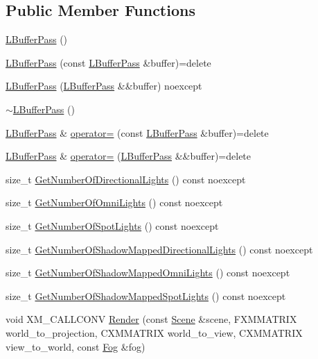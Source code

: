\subsection*{Public Member Functions}
\begin{DoxyCompactItemize}
\item 
\hyperlink{classmage_1_1_l_buffer_pass_acde2812780af700501ca945d62ed3dcc}{L\+Buffer\+Pass} ()
\item 
\hyperlink{classmage_1_1_l_buffer_pass_a0cd35fd1ded3c17d04c1689d1e30e476}{L\+Buffer\+Pass} (const \hyperlink{classmage_1_1_l_buffer_pass}{L\+Buffer\+Pass} \&buffer)=delete
\item 
\hyperlink{classmage_1_1_l_buffer_pass_ae68baaaa3fee2a76d64037f58d3e389b}{L\+Buffer\+Pass} (\hyperlink{classmage_1_1_l_buffer_pass}{L\+Buffer\+Pass} \&\&buffer) noexcept
\item 
\hyperlink{classmage_1_1_l_buffer_pass_ae9bad6fa2eb3827f9e28a3f21a974496}{$\sim$\+L\+Buffer\+Pass} ()
\item 
\hyperlink{classmage_1_1_l_buffer_pass}{L\+Buffer\+Pass} \& \hyperlink{classmage_1_1_l_buffer_pass_aec86026cd14a4b1609f709444bc453bd}{operator=} (const \hyperlink{classmage_1_1_l_buffer_pass}{L\+Buffer\+Pass} \&buffer)=delete
\item 
\hyperlink{classmage_1_1_l_buffer_pass}{L\+Buffer\+Pass} \& \hyperlink{classmage_1_1_l_buffer_pass_a3e4405a5af87c2c6f4839cb8502aa5de}{operator=} (\hyperlink{classmage_1_1_l_buffer_pass}{L\+Buffer\+Pass} \&\&buffer)=delete
\item 
size\+\_\+t \hyperlink{classmage_1_1_l_buffer_pass_a8a8c7af3c9c780f378411b928bb15a67}{Get\+Number\+Of\+Directional\+Lights} () const noexcept
\item 
size\+\_\+t \hyperlink{classmage_1_1_l_buffer_pass_a36adecea35365ec4ecc97698de68463c}{Get\+Number\+Of\+Omni\+Lights} () const noexcept
\item 
size\+\_\+t \hyperlink{classmage_1_1_l_buffer_pass_a52e32579e9843f3d6cf998cbf9a3f362}{Get\+Number\+Of\+Spot\+Lights} () const noexcept
\item 
size\+\_\+t \hyperlink{classmage_1_1_l_buffer_pass_a2e551261b4e661a0e6a773a0f3b66138}{Get\+Number\+Of\+Shadow\+Mapped\+Directional\+Lights} () const noexcept
\item 
size\+\_\+t \hyperlink{classmage_1_1_l_buffer_pass_ad78fcdd44e14f45837b864865b0dcf34}{Get\+Number\+Of\+Shadow\+Mapped\+Omni\+Lights} () const noexcept
\item 
size\+\_\+t \hyperlink{classmage_1_1_l_buffer_pass_a5b8f6954ae8d1005b2b1bdda1156f2aa}{Get\+Number\+Of\+Shadow\+Mapped\+Spot\+Lights} () const noexcept
\item 
void X\+M\+\_\+\+C\+A\+L\+L\+C\+O\+NV \hyperlink{classmage_1_1_l_buffer_pass_a701f7f6ad92abb4049f7ba625938b177}{Render} (const \hyperlink{classmage_1_1_scene}{Scene} \&scene, F\+X\+M\+M\+A\+T\+R\+IX world\+\_\+to\+\_\+projection, C\+X\+M\+M\+A\+T\+R\+IX world\+\_\+to\+\_\+view, C\+X\+M\+M\+A\+T\+R\+IX view\+\_\+to\+\_\+world, const \hyperlink{classmage_1_1_fog}{Fog} \&fog)
\end{DoxyCompactItemize}
